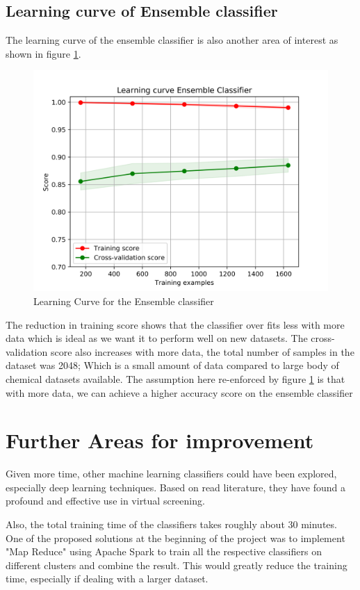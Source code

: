 \documentclass[a4paper,12pt]{article}
\begin{document}
	\subsection{Learning curve of Ensemble classifier}
	The learning curve of the ensemble classifier is also another area of interest as shown in figure \ref{fig:learning_curve_ensemble}.
		\begin{figure}[H]
			\centering
			\includegraphics[width=\textwidth,scale=1]{learning_curve_ensemble_clf}
			\caption{Learning Curve for the Ensemble classifier}
			\label{fig:learning_curve_ensemble}
		\end{figure}
	The reduction in training score shows that the classifier over fits less with more data which is ideal as we want it to perform well on new datasets. The cross-validation score also increases with more data, the total number of samples in the dataset was 2048; Which is a small amount of data compared to large body of chemical datasets available. The assumption here re-enforced by figure \ref{fig:learning_curve_ensemble} is that with more data, we can achieve a higher accuracy score on the ensemble classifier
	
\section{Further Areas for improvement}
	Given more time, other machine learning classifiers could have been explored, especially deep learning techniques. Based on read literature, they have found a profound and effective use in virtual screening. 
	
	Also, the total training time of the classifiers takes roughly about 30 minutes. One of the proposed solutions at the beginning of the project was to implement "Map Reduce" using Apache Spark to train all the respective classifiers on different clusters and combine the result. This would greatly reduce the training time, especially if dealing with a larger dataset.
\end{document}
